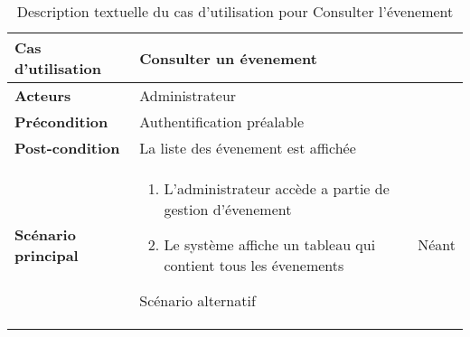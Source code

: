 \begin{longtable}{|>{\bfseries}p{4cm}|p{10cm}|}
\hline
Cas d’utilisation &  Consulter un évenement \\
\hline
Acteurs & Administrateur \\
\hline
Précondition & Authentification préalable\\
\hline
Post-condition & La liste des évenement  est affichée\\
\hline
Scénario principal & 
\begin{enumerate}
  \item  L’administrateur accède a partie de gestion d'évenement 

  \item Le système affiche un tableau qui contient tous les évenements

\end{enumerate} 
\hline
Scénario alternatif & Néant
 \hline
\caption{Description textuelle du cas d’utilisation pour  Consulter l'évenement }
\end{longtable}


